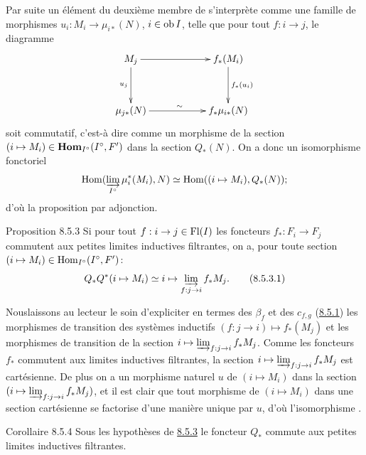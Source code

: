 \documentclass[10pt]{../fichiers-configuration-latex/smfart}
\begin{document}
Par suite un élément du deuxième membre de  s'interprète
comme une famille de morphismes $u_i : M_{i} \to \mu_{i\ast} (N)$, $i
\in \operatorname{ob} I$, telle que pour tout $f : i \to j$, le diagramme
\[
\xymatrix@C=2cm@R=1.25cm{
M_j  \ar[r] \ar[d]_{u_j}& f_{\ast}(M_i) \ar[d]^{f_{\ast}(u_i)}\\
\mu_{j\ast}(N)  \ar[r]^{\sim} & f_{\ast}\mu_{i\ast}(N)
}
\]
soit commutatif, c'est-à dire comme un morphisme de la section $(i
\mapsto M_i) \in \operatorname{\mathbf{Hom}}_{I^{\circ}} (I^{\circ}, F')$ dans la
section $Q_{\ast}(N)$. On a donc un isomorphisme fonctoriel
$$
\operatorname{Hom}(\varinjlim_{I^{\circ}} \mu_i^{\ast} (M_i), N)
\simeq \operatorname{Hom}((i \mapsto M_i), Q_{\ast}(N)){};
$$
d'où la proposition par adjonction.

\begin{enonce*}{Proposition 8.5.3}
Si pour tout $f : i \to j \in \text{\rm Fl}(I)$ les foncteurs
$f_{\ast} : F_i \to F_j$ commutent aux petites limites inductives filtrantes, on a, pour toute
section $(i \mapsto M_i) \in \operatorname{Hom}_{I^{\circ}}(I^{\circ}, F')$:
\begin{equation*}
Q_{\ast} Q^{\ast} (i \mapsto M_i) \simeq i \mapsto
\varinjlim_{f : j \to i} f_{\ast} M_j{\quoi}.\tag{8.5.3.1}
\end{equation*}
\end{enonce*}

\noindent Nous\pageoriginale laissons au lecteur le soin
d'expliciter en termes des $\beta_f$  et des $c_{f,
g}$ (\hyperref[VI.subsubsec8.5.1]{8.5.1}) les morphismes de transition des
systèmes inductifs $(f : j \to i) \mapsto f_{\ast}(M_j)$ et les
morphismes de transition de la section $i \mapsto \varinjlim_{f : j
\to i} f_{\ast} M_{j}$. Comme les foncteurs $f_{\ast}$ commutent aux
limites inductives filtrantes, la section $i\mapsto
\varinjlim_{f:j\to i} f_{\ast}M_{j}$ est cartésienne. De plus on a
un morphisme naturel $u$ de $(i \mapsto M_i)$ dans la section $(i
\mapsto \varinjlim_{f
  : j \to i}f_{\ast} M_j)$, et il est clair que tout morphisme de $(i
\mapsto M_i)$ dans une section cartésienne se factorise d'une manière
unique par $u$, d'où l'isomorphisme .

\begin{enonce*}{Corollaire 8.5.4}
Sous les hypothèses de \hyperref[VI.prop8.5.3]{8.5.3} le foncteur $Q_{\ast}$ commute aux
petites limites inductives filtrantes.
\end{enonce*}
\end{document}
